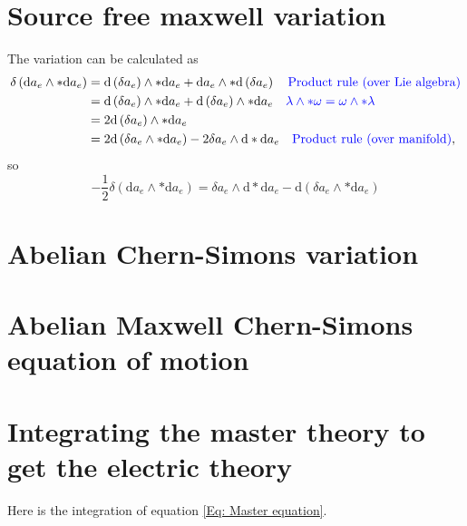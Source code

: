 \documentclass{article}
\begin{document}
\section{Source free maxwell variation}
\label{appendixsourcefreemaxwell}
The variation can be calculated as
\begin{align}
    \delta\left(\mathrm{d}a_{e} \wedge * \mathrm{d}a_{e}\right) &= \mathrm{d}\left(\delta a_{e} \right)\wedge * \mathrm{d}a_{e} + \mathrm{d}a_{e}\wedge * \mathrm{d}\left(\delta a_{e} \right) \nonumber \color{blue}\quad \text{Product rule (over Lie algebra)} \color{black} \\
    &= \mathrm{d}\left(\delta a_{e} \right)\wedge * \mathrm{d}a_{e} + \mathrm{d}\left(\delta a_{e} \right)\wedge *\mathrm{d}a_{e}\nonumber\color{blue}\quad \lambda\wedge * \omega  = \omega \wedge * \lambda\color{black}\\
    &= 2\mathrm{d}\left(\delta a_{e}\right)\wedge * \mathrm{d}a_{e}\nonumber \\
    &= 2\mathrm{d}\left(\delta a_{e}\wedge * \mathrm{d}a_{e} \right) - 2 \delta a_{e}\wedge \mathrm{d}*\mathrm{d}a_{e}\nonumber\quad \color{blue} \text{Product rule (over manifold)} \color{black},
\end{align}
so
\begin{equation}
    \boxed{
    -\frac{1}{2}\delta\left(\mathrm{d}a_{e} \wedge * \mathrm{d}a_{e}\right) = \delta a_{e}\wedge \mathrm{d}*\mathrm{d}a_{e} - \mathrm{d}\left(\delta a_{e}\wedge *\mathrm{d}a_{e} \right)
    }
\end{equation}


\section{Abelian Chern-Simons variation}
\label{appendixabelianchernsimonsvariation}



\section{Abelian Maxwell Chern-Simons equation of motion}
\label{appendixamcseom}

\section{Integrating the master theory to get the electric theory}
\label{appendixmagneticintegration}
Here is the integration of equation \eqref{Eq: Master equation}. 
\end{document}
